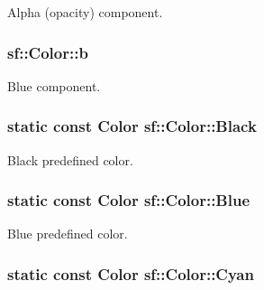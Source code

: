 Alpha (opacity) component. 

\hypertarget{classsf_1_1_color_a6707aedd0609c8920e12df5d7abc53cb}{
\subsubsection[{b}]{ sf\-::\-Color\-::b}}\label{classsf_1_1_color_a6707aedd0609c8920e12df5d7abc53cb}


Blue component. 

\hypertarget{classsf_1_1_color_a25bf5208c8c7668f1a3836acbbb23986}{
\subsubsection[{Black}]{\setlength{\rightskip}{0pt plus 5cm}static {\bf const} {\bf Color} sf\-::\-Color\-::\-Black\hspace{0.3cm}{\ttfamily [static]}}}\label{classsf_1_1_color_a25bf5208c8c7668f1a3836acbbb23986}


Black predefined color. 

\hypertarget{classsf_1_1_color_a6d901f24edce210decaeac1ccfdb28a9}{
\subsubsection[{Blue}]{\setlength{\rightskip}{0pt plus 5cm}static {\bf const} {\bf Color} sf\-::\-Color\-::\-Blue\hspace{0.3cm}{\ttfamily [static]}}}\label{classsf_1_1_color_a6d901f24edce210decaeac1ccfdb28a9}


Blue predefined color. 

\hypertarget{classsf_1_1_color_a1a5568e8b58269f1c739237e31bed9d8}{
\subsubsection[{Cyan}]{\setlength{\rightskip}{0pt plus 5cm}static {\bf const} {\bf Color} sf\-::\-Color\-::\-Cyan\hspace{0.3cm}{\ttfamily [static]}}}\label{classsf_1_1_color_a1a5568e8b58269f1c739237e31bed9d8}


